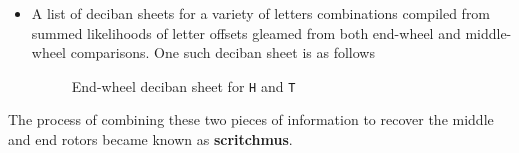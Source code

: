 \begin{itemize}
\begin{figure}[H]
      \end{figure}
    \item A list of deciban sheets for a variety of letters
      combinations compiled from summed likelihoods of letter offsets
      gleamed from both end-wheel and middle-wheel comparisons. One
      such deciban sheet is as follows
      \begin{figure}[H]
        \begin{center}
        \end{center}

        \caption{End-wheel deciban sheet for \texttt{H} and \texttt{T}}
        \label{fig:deciban_sheet}
      \end{figure}
  \end{itemize}
  The process of combining these two pieces of information to recover
  the middle and end rotors became known as {\bf{scritchmus}}.

